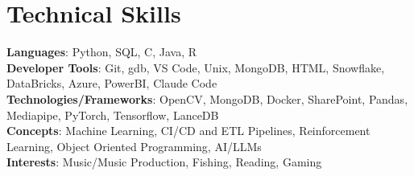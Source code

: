 \documentclass[letterpaper,11pt]{article}
\begin{document}
\section{Technical Skills}
     \begin{itemize}[leftmargin=0.00in, label={}]
        \small{\item{
         \textbf{Languages}{: Python, SQL, C, Java, R} \\
         \vspace{2pt}
         \textbf{Developer Tools}{: Git, gdb, VS Code, Unix, MongoDB, HTML, Snowflake, DataBricks, Azure, PowerBI, Claude Code} \\
         \vspace{2pt}
         \textbf{Technologies/Frameworks}{: OpenCV, MongoDB, Docker, SharePoint, Pandas, Mediapipe, PyTorch, Tensorflow, LanceDB } \\
         \vspace{2pt}
         \textbf{Concepts}{: Machine Learning, CI/CD and ETL Pipelines, Reinforcement Learning, Object Oriented Programming, AI/LLMs } \\
         \vspace{2pt}
         \textbf{Interests}{: Music/Music Production, Fishing, Reading, Gaming} \\
        }}
     \end{itemize}
\end{document}
